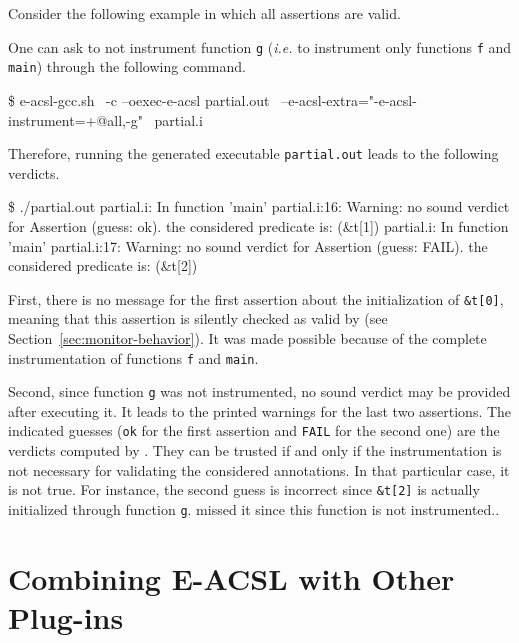 Consider the following example in which all assertions are valid.


One can ask to not instrument function \texttt{g} (\emph{i.e.} to instrument
only functions \texttt{f} and \texttt{main}) through the following command.
\begin{shell}
\$ e-acsl-gcc.sh \
  -c --oexec-e-acsl partial.out \
  --e-acsl-extra="-e-acsl-instrument=+@all,-g" \
  partial.i
\end{shell}

Therefore, running the generated executable \texttt{partial.out} leads to the
following verdicts.
\begin{shell}
\$ ./partial.out
partial.i: In function 'main'
partial.i:16: Warning: no sound verdict for Assertion (guess: ok).
        the considered predicate is:
        \initialized(&t[1])
partial.i: In function 'main'
partial.i:17: Warning: no sound verdict for Assertion (guess: FAIL).
        the considered predicate is:
        \initialized(&t[2])
\end{shell}

First, there is no message for the first assertion about the initialization of
\texttt{\&t[0]}, meaning that this assertion is silently checked as valid by
\eacsl (see Section~\ref{sec:monitor-behavior}). It was made possible because of
the complete instrumentation of functions \texttt{f} and \texttt{main}.

Second, since function \texttt{g} was not instrumented, no sound verdict may be
provided after executing it. It leads to the printed warnings for the last two
assertions. The indicated guesses (\texttt{ok} for the first assertion and
\texttt{FAIL} for the second one) are the verdicts computed by \eacsl. They can
be trusted if and only if the \eacsl instrumentation is not necessary for
validating the considered annotations. In that particular case, it is not
true. For instance, the second guess is incorrect since \texttt{\&t[2]} is
actually initialized through function \texttt{g}. \eacsl missed it since this
function is not instrumented..

\section{Combining E-ACSL with Other Plug-ins} %
\label{sec:combine}

